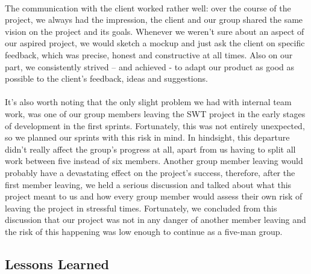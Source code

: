 \ \\
The communication with the client worked rather well: over the course of the project, we always had the impression, the client and our group shared the same vision on the project and its goals. Whenever we weren’t sure about an aspect of our aspired project, we would sketch a mockup and just ask the client on specific feedback, which was precise, honest and constructive at all times. Also on our part, we consistently strived – and achieved - to adapt our product as good as possible to the client’s feedback, ideas and suggestions.\\
\ \\
It’s also worth noting that the only slight problem we had with internal team work, was one of our group members leaving the SWT project in the early stages of development in the first sprints. Fortunately, this was not entirely unexpected, so we planned our sprints with this risk in mind. In hindsight, this departure didn’t really affect the group’s progress at all, apart from us having to split all work between five instead of six members. Another group member leaving would probably have a devastating effect on the project’s success, therefore, after the first member leaving, we held a serious discussion and talked about what this project meant to us and how every group member would assess their own risk of leaving the project in stressful times. Fortunately, we concluded from this discussion that our project was not in any danger of another member leaving and the risk of this happening was low enough to continue as a five-man group.\\


\subsection{Lessons Learned}

